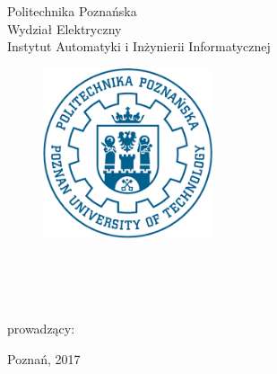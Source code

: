 \thispagestyle{empty}
\begin{center}
Politechnika Poznańska\\
Wydział Elektryczny\\  
Instytut Automatyki i Inżynierii Informatycznej\\
\begin{figure}[ht!]
\centering
\includegraphics[width=50mm]{pplogo.png}
\end{figure}
  \vspace{5mm}
\large{\StudentA} \large{\AlbumA}\\
\large{\StudentB} \large{\AlbumB}\\
  \vspace{10mm}
\large{\TytulPolski}\\
  \vspace{10mm}
\end{center}
\vspace{40mm}
\begin{flushright}
prowadzący:\\
\Prowadzacy
\end{flushright}

\vspace{10mm}
\begin{center}
Poznań, 2017
\end{center}